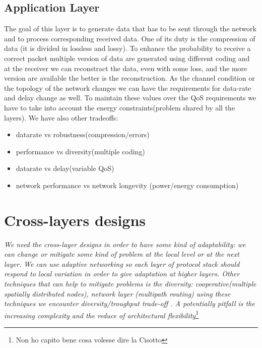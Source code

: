 \subsection{Application Layer}
The goal of this layer is to generate data that has to be sent through the network and to process corresponding received data. One of its duty is the compression of data (it is divided in lossless and lossy).
To enhance the probability to receive a correct packet multiple version of data are generated using different coding and at the receiver we can reconstract the data, even with some loss, and the more version are available the better is the reconstruction.
As the channel condition or the topology of the network changes we can have the requirements for data-rate and delay change as well. To maintain these values over the QoS requirements we have to take into account the energy constraints(problem shared by all the layers). We have also other tradeoffs:
\begin{itemize}
	\item datarate vs robustness(compression/errors)
	\item performance vs diversity(multiple coding)
	\item datarate vs delay(variable QoS)
	\item network performance vs network longevity (power/energy consumption)
\end{itemize}

\section{Cross-layers designs}
\textit{We need the cross-layer designs in order to have some kind of adaptability: we can change or mitigate some kind of problem at the local level or at the next layer. We can use adaptive networking so each layer of protocol stack should respond to local variation in order to give adaptation at higher layers. Other techniques that can help to mitigate problems is the diversity: cooperative(multiple spatially distributed nodes), network layer (multipath routing) using these techniques we encounter diversity/troughput trade-off .
A potentially pitfall is the increasing complexity and the reduce of architectural flexibility}\footnote{Non ho capito bene cosa volesse dire la Cisotto}
